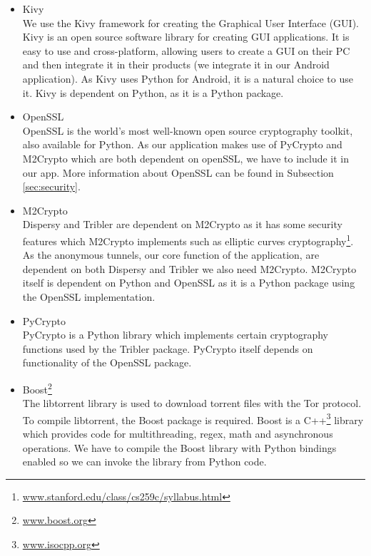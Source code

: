 		\begin{itemize}
		
			\item Kivy\\
			We use the Kivy framework for creating the Graphical User Interface (GUI). Kivy is an open source software library for creating GUI applications. It is easy to use and cross-platform, allowing users to create a GUI on their PC and then integrate it in their products (we integrate it in our Android application). As Kivy uses Python for Android, it is a natural choice to use it. Kivy is dependent on Python, as it is a Python package. 
		
			\item OpenSSL\\
			OpenSSL is the world's most well-known open source cryptography toolkit, also available for Python. As our application makes use of PyCrypto and M2Crypto which are both dependent on openSSL, we have to include it in our app. More information about OpenSSL can be found in Subsection \ref{sec:security}.
		
			\item M2Crypto\\
			Dispersy and Tribler are dependent on M2Crypto as it has some security features which M2Crypto implements such as elliptic curves cryptography\footnote{\href{http://www.stanford.edu/class/cs259c/syllabus.html}{www.stanford.edu/class/cs259c/syllabus.html}}. As the anonymous tunnels, our core function of the application, are dependent on both Dispersy and Tribler we also need M2Crypto. M2Crypto itself is dependent on Python and OpenSSL as it is a Python package using the OpenSSL implementation.
		
			\item PyCrypto\\
			PyCrypto is a Python library which implements certain cryptography functions used by the Tribler package. PyCrypto itself depends on functionality of the OpenSSL package.
		
			\item Boost\footnote{\href{http://www.boost.org/}{www.boost.org}}\\
			The libtorrent library is used to download torrent files with the Tor protocol. To compile libtorrent, the Boost package is required. Boost is a C++\footnote{\href{http://isocpp.org/}{www.isocpp.org}} library which provides code for multithreading, regex, math and asynchronous operations. We have to compile the Boost library with Python bindings enabled so we can invoke the library from Python code.
		

\end{itemize}
